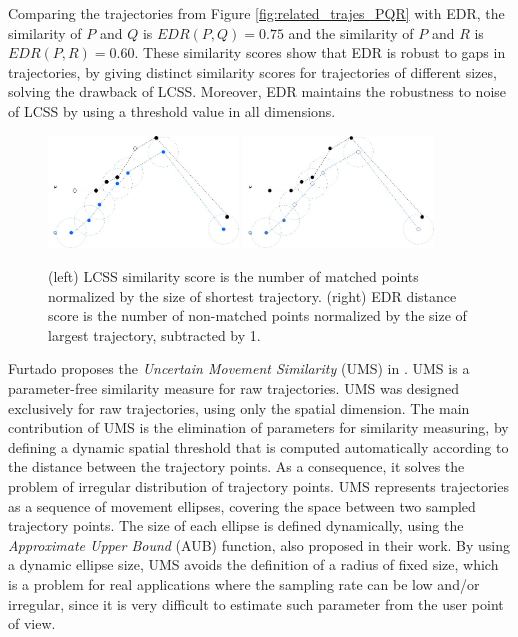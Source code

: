 \documentclass[12pt]{article}
\begin{document}
Comparing the trajectories from Figure \ref{fig:related_trajes_PQR} with EDR, the similarity of $P$ and $Q$ is $EDR(P, Q) = 0.75$ and the similarity of $P$ and $R$ is $EDR(P, R) = 0.60$. These similarity scores show that EDR is robust to gaps in trajectories, by giving distinct similarity scores for trajectories of different sizes, solving the drawback of LCSS. Moreover, EDR maintains the robustness to noise of LCSS by using a threshold value in all dimensions.

\begin{figure}[h]
\centering
\includegraphics[width=0.45\textwidth]{Related_Works/related_trajes-LCSS.jpg}
\includegraphics[width=0.45\textwidth]{Related_Works/related_trajes-EDR.jpg}
\caption{\label{fig:related_trajes_EDR_LCSS}(left) LCSS similarity score is the number of matched points normalized by the size of shortest trajectory. (right) EDR distance score is the number of non-matched points normalized by the size of largest trajectory, subtracted by 1.}
\end{figure}

Furtado proposes the \emph{Uncertain Movement Similarity} (UMS) in \cite{Furtado-UMS-2018}. UMS is a parameter-free similarity measure for raw trajectories. UMS was designed exclusively for raw trajectories, using only the spatial dimension. The main contribution of UMS is the elimination of parameters for similarity measuring, by defining a dynamic spatial threshold that is computed automatically according to the distance between the trajectory points. As a consequence, it solves the problem of irregular distribution of trajectory points. UMS represents trajectories as a sequence of movement ellipses, covering the space between two sampled trajectory points. The size of each ellipse is defined dynamically, using the \emph{Approximate Upper Bound} (AUB) function, also proposed in their work. By using a dynamic ellipse size,  UMS avoids the definition of a radius of fixed size, which is a problem for real applications where the sampling rate can be low and/or irregular, since it is very difficult to estimate such parameter from the user point of view.
\end{document}
